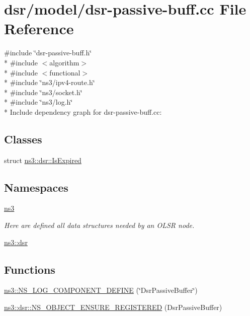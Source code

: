 \hypertarget{dsr-passive-buff_8cc}{}\section{dsr/model/dsr-\/passive-\/buff.cc File Reference}
\label{dsr-passive-buff_8cc}
{\ttfamily \#include \char`\"{}dsr-\/passive-\/buff.\+h\char`\"{}}\\*
{\ttfamily \#include $<$algorithm$>$}\\*
{\ttfamily \#include $<$functional$>$}\\*
{\ttfamily \#include \char`\"{}ns3/ipv4-\/route.\+h\char`\"{}}\\*
{\ttfamily \#include \char`\"{}ns3/socket.\+h\char`\"{}}\\*
{\ttfamily \#include \char`\"{}ns3/log.\+h\char`\"{}}\\*
Include dependency graph for dsr-\/passive-\/buff.cc\+:
\subsection*{Classes}
\begin{DoxyCompactItemize}
\item 
struct \hyperlink{structns3_1_1dsr_1_1IsExpired}{ns3\+::dsr\+::\+Is\+Expired}
\end{DoxyCompactItemize}
\subsection*{Namespaces}
\begin{DoxyCompactItemize}
\item 
 \hyperlink{namespacens3}{ns3}
\begin{DoxyCompactList}\small\item\em Here are defined all data structures needed by an O\+L\+SR node. \end{DoxyCompactList}\item 
 \hyperlink{namespacens3_1_1dsr}{ns3\+::dsr}
\end{DoxyCompactItemize}
\subsection*{Functions}
\begin{DoxyCompactItemize}
\item 
\hyperlink{namespacens3_abaad958c219b3ccd0dec3049b9b8ad09}{ns3\+::\+N\+S\+\_\+\+L\+O\+G\+\_\+\+C\+O\+M\+P\+O\+N\+E\+N\+T\+\_\+\+D\+E\+F\+I\+NE} (\char`\"{}Dsr\+Passive\+Buffer\char`\"{})
\item 
\hyperlink{namespacens3_1_1dsr_ae9d49d975bfe6ab0713b710c95be830c}{ns3\+::dsr\+::\+N\+S\+\_\+\+O\+B\+J\+E\+C\+T\+\_\+\+E\+N\+S\+U\+R\+E\+\_\+\+R\+E\+G\+I\+S\+T\+E\+R\+ED} (Dsr\+Passive\+Buffer)
\end{DoxyCompactItemize}
